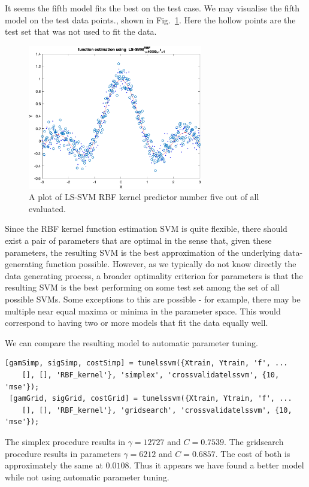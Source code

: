 \documentclass[10pt,a4paper]{article}
\begin{document}
It seems the fifth model fits the best on the test case. We may visualise the fifth model on the test data points., shown in Fig.~\ref{fig:fifthModelPlot}. Here the hollow points are the test set that was not used to fit the data.

\begin{figure}[h!]
\centering
  \includegraphics[width=3in]{fifthModelPlot.png}
  \caption{A plot of LS-SVM RBF kernel predictor number five out of all evaluated.}
  \label{fig:fifthModelPlot}
\end{figure}

Since the RBF kernel function estimation SVM is quite flexible, there should exist a pair of parameters that are optimal in the sense that, given these parameters, the resulting SVM is the best approximation of the underlying data-generating function possible. However, as we typically do not know directly the data generating process, a broader optimality criterion for parameters is that the resulting SVM is the best performing on some test set among the set of all possible SVMs. Some exceptions to this are possible - for example, there may be multiple near equal maxima or minima in the parameter space. This would correspond to having two or more models that fit the data equally well.

We can compare the resulting model to automatic parameter tuning.

\begin{lstlisting}[style=Matlab-editor, frame=single]
[gamSimp, sigSimp, costSimp] = tunelssvm({Xtrain, Ytrain, 'f', ...
    [], [], 'RBF_kernel'}, 'simplex', 'crossvalidatelssvm', {10, 'mse'});
 [gamGrid, sigGrid, costGrid] = tunelssvm({Xtrain, Ytrain, 'f', ...
    [], [], 'RBF_kernel'}, 'gridsearch', 'crossvalidatelssvm', {10, 'mse'});
\end{lstlisting}

The simplex procedure results in $\gamma=12727$ and $C=0.7539$. The gridsearch procedure results in parameters $\gamma=6212$ and $C=0.6857$. The cost of both is approximately the same at $0.0108$. Thus it appears we have found a better model while not using automatic parameter tuning.
\end{document}
